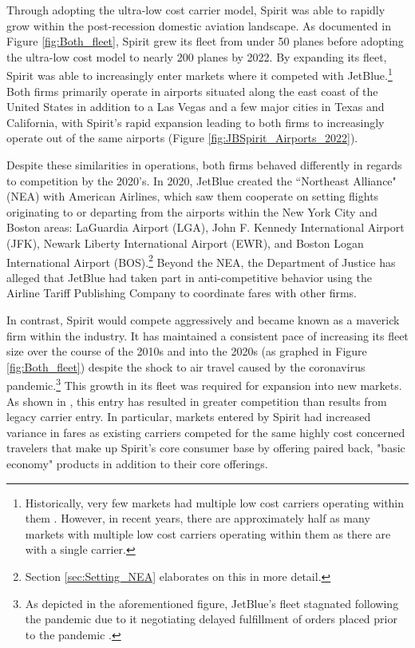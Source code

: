 \documentclass{article}
\begin{document}
     Through adopting the ultra-low cost carrier model, Spirit was able to rapidly grow within the post-recession domestic aviation landscape. As documented in Figure \ref{fig:Both_fleet}, Spirit grew its fleet from under 50 planes before adopting the ultra-low cost model to nearly 200 planes by 2022. By expanding its fleet, Spirit was able to increasingly enter markets where it competed with JetBlue.\footnote{Historically, very few markets had multiple low cost carriers operating within them \citep{kwoka_fringe_2016, ciliberto_market_2021}. However, in recent years, there are approximately half as many markets with multiple low cost carriers operating within them as there are with a single carrier.} Both firms primarily operate in airports situated along the east coast of the United States in addition to a Las Vegas and a few major cities in Texas and California, with Spirit's rapid expansion leading to both firms to increasingly operate out of the same airports (Figure \ref{fig:JBSpirit_Airports_2022}).
	
	Despite these similarities in operations, both firms behaved differently in regards to competition by the 2020's.  In 2020, JetBlue created the ``Northeast Alliance" (NEA) with American Airlines, which saw them cooperate on setting flights originating to or departing from the airports within the New York City and Boston areas: LaGuardia Airport (LGA), John F. Kennedy International Airport (JFK), Newark Liberty International Airport (EWR), and Boston Logan International Airport (BOS).\footnote{Section \ref{sec:Setting_NEA} elaborates on this in more detail.} Beyond the NEA, the Department of Justice has alleged that JetBlue had taken part in anti-competitive behavior using the Airline Tariff Publishing Company to coordinate fares with other firms. 
	
	In contrast, Spirit would compete aggressively and became known as a maverick firm within the industry. It has maintained a consistent pace of increasing its fleet size over the course of the 2010s and into the 2020s (as graphed in Figure \ref{fig:Both_fleet}) despite the shock to air travel caused by the coronavirus pandemic.\footnote{As depicted in the aforementioned figure, JetBlue's fleet stagnated following the pandemic due to it negotiating delayed fulfillment of orders placed prior to the pandemic \citep{bellamy_iii_jetblue_2020, sipinski_jetblue_2020}.} This growth in its fleet was required for expansion into new markets. As shown in \citet{shrago_spirit_2024}, this entry has resulted in greater competition than results from legacy carrier entry. In particular, markets entered by Spirit had increased variance in fares as existing carriers competed for the same highly cost concerned travelers that make up Spirit's core consumer base by offering paired back, "basic economy" products in addition to their core offerings.
\end{document}
